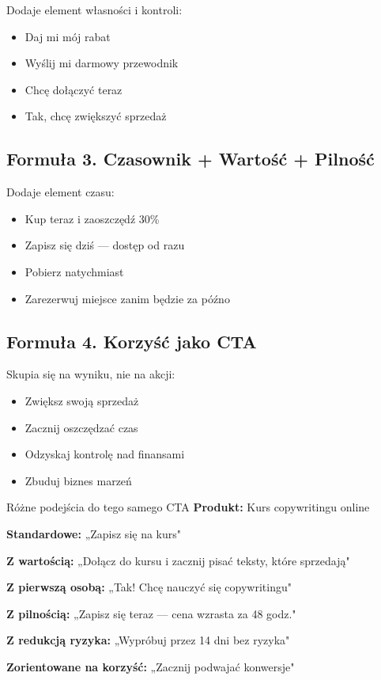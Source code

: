 \documentclass[
  12pt,
  a4paper,
  twoside,
  openright,
  12pt,
  DIV=12,
  BCOR=12mm]{scrbook}
\providecommand{\tightlist}{%
  \setlength{\itemsep}{0pt}\setlength{\parskip}{0pt}}\usepackage{longtable,booktabs,array}
\begin{document}
Dodaje element własności i kontroli:

\begin{itemize}
\tightlist
\item
  Daj mi mój rabat
\item
  Wyślij mi darmowy przewodnik
\item
  Chcę dołączyć teraz
\item
  Tak, chcę zwiększyć sprzedaż
\end{itemize}

\subsection{Formuła 3. Czasownik + Wartość +
Pilność}\label{formuux142a-3.-czasownik-wartoux15bux107-pilnoux15bux107}

Dodaje element czasu:

\begin{itemize}
\tightlist
\item
  Kup teraz i zaoszczędź 30\%
\item
  Zapisz się dziś --- dostęp od razu
\item
  Pobierz natychmiast
\item
  Zarezerwuj miejsce zanim będzie za późno
\end{itemize}

\subsection{Formuła 4. Korzyść jako
CTA}\label{formuux142a-4.-korzyux15bux107-jako-cta}

Skupia się na wyniku, nie na akcji:

\begin{itemize}
\tightlist
\item
  Zwiększ swoją sprzedaż
\item
  Zacznij oszczędzać czas
\item
  Odzyskaj kontrolę nad finansami
\item
  Zbuduj biznes marzeń
\end{itemize}

\begin{przyklad}{Różne podejścia do tego samego CTA}
\textbf{Produkt:} Kurs copywritingu online

\textbf{Standardowe:} „Zapisz się na kurs"

\textbf{Z wartością:} „Dołącz do kursu i zacznij pisać teksty, które sprzedają"

\textbf{Z pierwszą osobą:} „Tak! Chcę nauczyć się copywritingu"

\textbf{Z pilnością:} „Zapisz się teraz --- cena wzrasta za 48 godz."

\textbf{Z redukcją ryzyka:} „Wypróbuj przez 14 dni bez ryzyka"

\textbf{Zorientowane na korzyść:} „Zacznij podwajać konwersje"
\end{przyklad}
\end{document}

